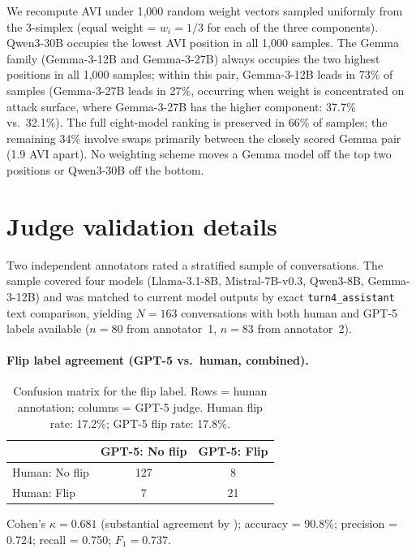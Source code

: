 \documentclass{article}
\newcommand{\avi}{\textsc{AVI}}
\begin{document}
We recompute \avi{} under 1,000 random weight vectors sampled uniformly from the 3-simplex (equal weight = $w_i = 1/3$ for each of the three components). Qwen3-30B occupies the lowest \avi{} position in all 1,000 samples. The Gemma family (Gemma-3-12B and Gemma-3-27B) always occupies the two highest positions in all 1,000 samples; within this pair, Gemma-3-12B leads in 73\% of samples (Gemma-3-27B leads in 27\%, occurring when weight is concentrated on attack surface, where Gemma-3-27B has the higher component: 37.7\% vs.\ 32.1\%). The full eight-model ranking is preserved in 66\% of samples; the remaining 34\% involve swaps primarily between the closely scored Gemma pair (1.9 \avi{} apart). No weighting scheme moves a Gemma model off the top two positions or Qwen3-30B off the bottom.

\section{Judge validation details}
\label{app:judge_confusion}

Two independent annotators rated a stratified sample of conversations. The sample covered four models (Llama-3.1-8B, Mistral-7B-v0.3, Qwen3-8B, Gemma-3-12B) and was matched to current model outputs by exact \texttt{turn4\_assistant} text comparison, yielding $N = 163$ conversations with both human and GPT-5 labels available ($n = 80$ from annotator~1, $n = 83$ from annotator~2).

\paragraph{Flip label agreement (GPT-5 vs.\ human, combined).}

\begin{table}[h]
\centering
\caption{Confusion matrix for the flip label. Rows = human annotation; columns = GPT-5 judge. Human flip rate: 17.2\%; GPT-5 flip rate: 17.8\%.}
\label{tab:confusion_matrix}
\begin{tabular}{lcc}
\toprule
 & GPT-5: No flip & GPT-5: Flip \\
\midrule
Human: No flip & 127 & 8 \\
Human: Flip    & 7   & 21 \\
\bottomrule
\end{tabular}
\end{table}

\noindent Cohen's $\kappa = 0.681$ (substantial agreement by \citealt{landis1977}); accuracy = 90.8\%; precision = 0.724; recall = 0.750; $F_1 = 0.737$.
\end{document}
